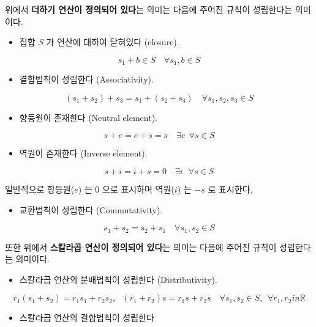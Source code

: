 \documentclass[
  11pt,
  a4paper,
  oneside]{scrbook}
\providecommand{\tightlist}{%
  \setlength{\itemsep}{0pt}\setlength{\parskip}{0pt}}\usepackage{longtable,booktabs,array}
\newcommand{\RR}{\mathbb{R}}
\theoremstyle{definition}
\theoremstyle{plain}
\theoremstyle{definition}
\theoremstyle{definition}
\theoremstyle{remark}
\begin{document}
위에서 \textbf{더하기 연산이 정의되어 있다}는 의미는 다음에 주어진
규칙이 성립한다는 의미이다.

\begin{itemize}
\tightlist
\item
  집합 \(S\) 가 연산에 대하여 닫혀있다 (closure).
\end{itemize}

\[  s_1 + b \in S \quad \forall s_1,b \in S \]

\begin{itemize}
\tightlist
\item
  결합법칙이 성립한다 (Associativity).
\end{itemize}

\[  (s_1 + s_2) + s_3 = s_1 + (s_2 +s_3)  \quad \forall s_1,s_2,s_3 \in S \]

\begin{itemize}
\tightlist
\item
  항등원이 존재한다 (Neutral element).
\end{itemize}

\[  s + e = e + s = s \quad \exists e ~~\forall s \in S \]

\begin{itemize}
\tightlist
\item
  역원이 존재한다 (Inverse element).
\end{itemize}

\[ s + i = i  + s = 0 \quad \exists i ~~\ \forall s \in S \]

일반적으로 항등원(\(e\)) 는 \(0\) 으로 표시하며 역원(\(i\)) 는 \(-s\) 로
표시한다.

\begin{itemize}
\tightlist
\item
  교환법칙이 성립한다 (Commutativity).
\end{itemize}

\[  s_1 + s_2 = s_2 + s_1  \quad \forall s_1,s_2 \in S \]

또한 위에서 \textbf{스칼라곱 연산이 정의되어 있다}는 의미는 다음에
주어진 규칙이 성립한다는 의미이다.

\begin{itemize}
\tightlist
\item
  스칼라곱 연산의 분배법칙이 성립한다 (Distributivity).
\end{itemize}

\[  r_1(s_1+s_2) = r_1 s_1 + r_2 s_2,~~~ (r_1+r_2)s = r_1 s + r_2 s  \quad \forall s_1,s_2 \in S, ~~ \forall r_1,r_2 in \RR \]

\begin{itemize}
\tightlist
\item
  스칼라곱 연산의 결합법칙이 성립한다
\end{itemize}
\end{document}
